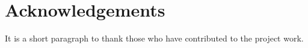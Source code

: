 \chapter*{Acknowledgements} 
\normalsize 
\vspace{5mm}

It is a short paragraph to thank those who have contributed to the project work.
